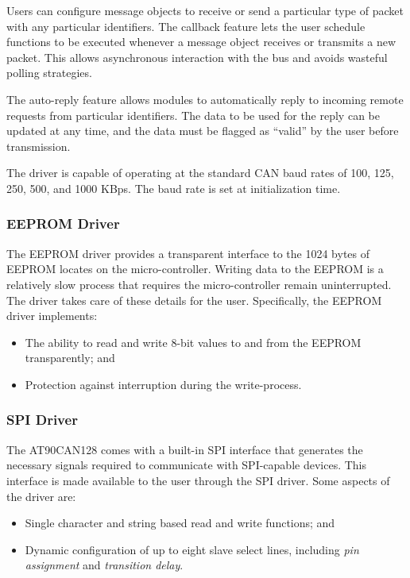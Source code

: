 Users can configure message objects to receive or send a particular type of packet with any particular identifiers. The callback feature lets the user schedule functions to be executed whenever a message object receives or transmits a new packet. This allows asynchronous interaction with the bus and avoids wasteful polling strategies.

The auto-reply feature allows modules to automatically reply to incoming remote requests from particular identifiers. The data to be used for the reply can be updated at any time, and the data must be flagged as ``valid'' by the user before transmission.

The driver is capable of operating at the standard CAN baud rates of 100, 125, 250, 500, and 1000 KBps. The baud rate is set at initialization time.

\subsubsection{EEPROM Driver}

The EEPROM driver provides a transparent interface to the 1024 bytes of EEPROM locates on the micro-controller. Writing data to the EEPROM is a relatively slow process that requires the micro-controller remain uninterrupted. The driver takes care of these details for the user. Specifically, the EEPROM driver implements:

\begin{itemize}
\item The ability to read and write 8-bit values to and from the EEPROM transparently; and
\item Protection against interruption during the write-process.
\end{itemize}

\subsubsection{SPI Driver}
\label{sec:impl_spi_driver}

The AT90CAN128 comes with a built-in SPI interface that generates the necessary signals required to communicate with SPI-capable devices. This interface is made available to the user through the SPI driver. Some aspects of the driver are:

\begin{itemize}
\item Single character and string based read and write functions; and
\item Dynamic configuration of up to eight slave select lines, including \emph{pin assignment} and \emph{transition delay}.
\end{itemize}

